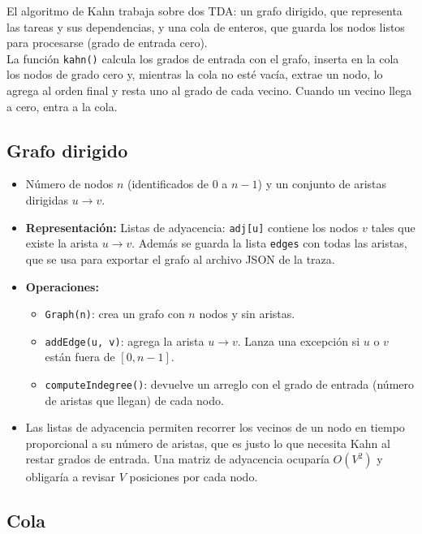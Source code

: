 \documentclass[a4paper, table]{article}
\begin{document}
El algoritmo de Kahn trabaja sobre dos TDA: un {grafo dirigido}, que representa las tareas y sus dependencias, y una {cola} de enteros, que guarda los nodos listos para procesarse (grado de entrada cero). \\

La función \texttt{kahn()} calcula los grados de entrada con el grafo, inserta en la cola los nodos de grado cero y, mientras la cola no esté vacía, extrae un nodo, lo agrega al orden final y resta uno al grado de cada vecino. Cuando un vecino llega a cero, entra a la cola.

\subsection{Grafo dirigido}

\begin{itemize}
    \item Número de nodos $n$ (identificados de $0$ a $n-1$) y un conjunto de aristas dirigidas $u \rightarrow v$.
    \item \textbf{Representación:} Listas de adyacencia: \texttt{adj[u]} contiene los nodos $v$ tales que existe la arista $u \rightarrow v$. Además se guarda la lista \texttt{edges} con todas las aristas, que se usa para exportar el grafo al archivo JSON de la traza.
    \item \textbf{Operaciones:}
    \begin{itemize}
      \item \texttt{Graph(n)}: crea un grafo con $n$ nodos y sin aristas.
      \item \texttt{addEdge(u, v)}: agrega la arista $u \rightarrow v$. Lanza una excepción si $u$ o $v$ están fuera de $[0, n-1]$.
      \item \texttt{computeIndegree()}: devuelve un arreglo con el grado de entrada (número de aristas que llegan) de cada nodo.
    \end{itemize}
    \item Las listas de adyacencia permiten recorrer los vecinos de un nodo en tiempo proporcional a su número de aristas, que es justo lo que necesita Kahn al restar grados de entrada. Una matriz de adyacencia ocuparía $O(V^2)$ y obligaría a revisar $V$ posiciones por cada nodo.
\end{itemize}

\subsection{Cola}
\end{document}
